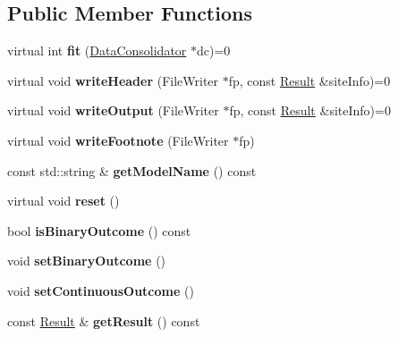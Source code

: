\subsection*{Public Member Functions}
\begin{DoxyCompactItemize}
\item 
\hypertarget{classModelFitter_afc83ca5c7ac8a67c8a9d29ec3c57b5e7}{virtual int {\bfseries fit} (\hyperlink{classDataConsolidator}{Data\-Consolidator} $\ast$dc)=0}\label{classModelFitter_afc83ca5c7ac8a67c8a9d29ec3c57b5e7}

\item 
\hypertarget{classModelFitter_a278e57cc5d181a7b35c107322ae527a0}{virtual void {\bfseries write\-Header} (File\-Writer $\ast$fp, const \hyperlink{classResult}{Result} \&site\-Info)=0}\label{classModelFitter_a278e57cc5d181a7b35c107322ae527a0}

\item 
\hypertarget{classModelFitter_a3943a0d27e67b6223c0ae35de19bcf16}{virtual void {\bfseries write\-Output} (File\-Writer $\ast$fp, const \hyperlink{classResult}{Result} \&site\-Info)=0}\label{classModelFitter_a3943a0d27e67b6223c0ae35de19bcf16}

\item 
\hypertarget{classModelFitter_ad71117c9dec501a879e35c47dbd06096}{virtual void {\bfseries write\-Footnote} (File\-Writer $\ast$fp)}\label{classModelFitter_ad71117c9dec501a879e35c47dbd06096}

\item 
\hypertarget{classModelFitter_ade717703169cd941319520567f4d0e71}{const std\-::string \& {\bfseries get\-Model\-Name} () const }\label{classModelFitter_ade717703169cd941319520567f4d0e71}

\item 
\hypertarget{classModelFitter_a533cc2f91ad6a55a1dab1f4f28833da9}{virtual void {\bfseries reset} ()}\label{classModelFitter_a533cc2f91ad6a55a1dab1f4f28833da9}

\item 
\hypertarget{classModelFitter_a1f1037669ff3a4b564e7787516bc75fc}{bool {\bfseries is\-Binary\-Outcome} () const }\label{classModelFitter_a1f1037669ff3a4b564e7787516bc75fc}

\item 
\hypertarget{classModelFitter_ad81b3fa897788405095cd405604b223a}{void {\bfseries set\-Binary\-Outcome} ()}\label{classModelFitter_ad81b3fa897788405095cd405604b223a}

\item 
\hypertarget{classModelFitter_a93c9f18c48b73e6f4cdd66b4d0a83e5c}{void {\bfseries set\-Continuous\-Outcome} ()}\label{classModelFitter_a93c9f18c48b73e6f4cdd66b4d0a83e5c}

\item 
\hypertarget{classModelFitter_a357f8d42cd176127a8ebf578e28e4c22}{const \hyperlink{classResult}{Result} \& {\bfseries get\-Result} () const }\label{classModelFitter_a357f8d42cd176127a8ebf578e28e4c22}

\end{DoxyCompactItemize}
